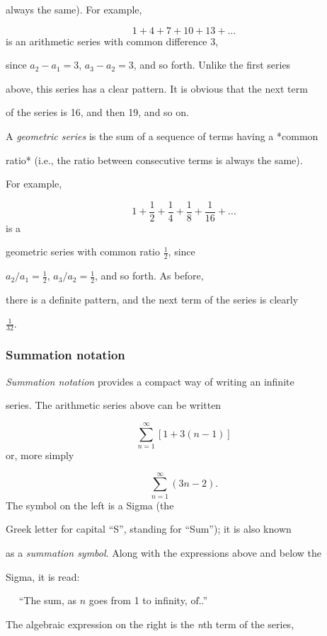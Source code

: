 always the same). For example,


\[
1+4+7+10+13+\dots
\] is an arithmetic series with common difference 3,

since $a_2-a_1=3$, $a_3-a_2=3$, and so forth. Unlike the first series

above, this series has a clear pattern. It is obvious that the next term

of the series is 16, and then 19, and so on.


A \textit{geometric series} is the sum of a sequence of terms having a *common

ratio* (i.e., the ratio between consecutive terms is always the same).

For example,


\[
1+\frac{1}{2}+\frac{1}{4}+\frac{1}{8}+\frac{1}{16}+\ldots
\] is a

geometric series with common ratio $\tfrac{1}{2}$, since

$a_2/a_1=\tfrac{1}{2}$, $a_3/a_2=\tfrac{1}{2}$, and so forth. As before,

there is a definite pattern, and the next term of the series is clearly

$\tfrac{1}{32}$.


\subsubsection{Summation notation}
\label{sss:summ-2e90}


\textit{Summation notation} provides a compact way of writing an infinite

series. The arithmetic series above can be written


\[
\sum _{n=1}^{\infty} [1+3(n-1)]
\] or, more simply


\[
\sum _{n=1}^{\infty} (3n-2).
\] The symbol on the left is a Sigma (the

Greek letter for capital ``S'', standing for ``Sum''); it is also known

as a \textit{summation symbol}. Along with the expressions above and below the

Sigma, it is read:


$\quad$ ``The sum, as $n$ goes from 1 to infinity, of\...''


The algebraic expression on the right is the \textit{n}th term of the series,

